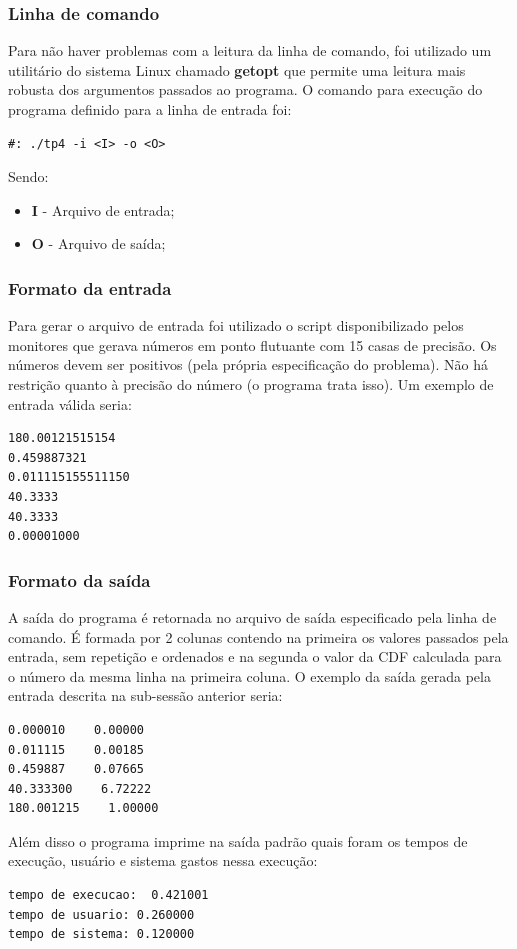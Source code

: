 \documentclass[12pt]{article}
\begin{document}
\subsubsection{Linha de comando}
Para não haver problemas com a leitura da linha de comando, foi utilizado um utilitário do
sistema Linux chamado \textbf{getopt} que permite uma leitura mais robusta dos argumentos
passados ao programa. O comando para execução do programa definido para a linha de entrada 
foi:
\begin{verbatim}
#: ./tp4 -i <I> -o <O>
\end{verbatim}
Sendo: 
\begin{itemize}
  \item \textbf{I} - Arquivo de entrada;
  \item \textbf{O} - Arquivo de saída;
\end{itemize}

\subsubsection{Formato da entrada}
Para gerar o arquivo de entrada foi utilizado o script disponibilizado pelos monitores que 
gerava números em ponto flutuante com 15 casas de precisão. Os números devem ser positivos 
(pela própria especificação do problema). Não há restrição quanto à  precisão do número (o 
programa trata isso). Um exemplo de entrada válida seria:
\begin{verbatim}
180.00121515154
0.459887321
0.011115155511150
40.3333
40.3333
0.00001000
\end{verbatim}

\subsubsection{Formato da saída}
A saída do programa é retornada no arquivo de saída especificado pela linha de comando.
É formada por 2 colunas contendo na primeira os valores passados pela entrada, sem repetição
e ordenados e na segunda o valor da CDF calculada para o número da mesma linha na primeira 
coluna. O exemplo da saída gerada pela entrada descrita na sub-sessão anterior seria:
\begin{verbatim}
0.000010    0.00000
0.011115    0.00185
0.459887    0.07665
40.333300    6.72222
180.001215    1.00000
\end{verbatim}

Além disso o programa imprime na saída padrão quais foram os tempos de execução, usuário e sistema
gastos nessa execução:
\begin{verbatim}
tempo de execucao:  0.421001
tempo de usuario: 0.260000
tempo de sistema: 0.120000
\end{verbatim}
\end{document}
